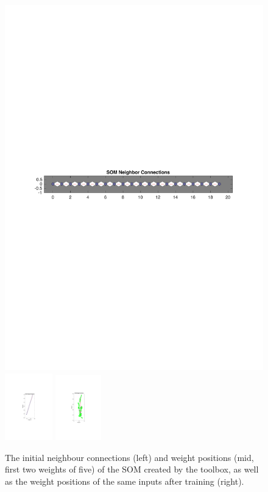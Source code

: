 \documentclass[10pt, oneside]{article}
\begin{document}
\begin{figure}[h]
\begin{center}
\includegraphics[width=12.5cm]{somnc.pdf} \includegraphics[width=2.07cm]{sompos.pdf} \includegraphics[width=2cm]{sompos-aftertraining.pdf}
\end{center}
\caption{\label{fig:som-init} The initial neighbour connections (left) and weight positions (mid, first two weights of five) of the SOM created by the toolbox, as well as the weight positions of the same inputs after training (right).}
\end{figure}
\end{document}
